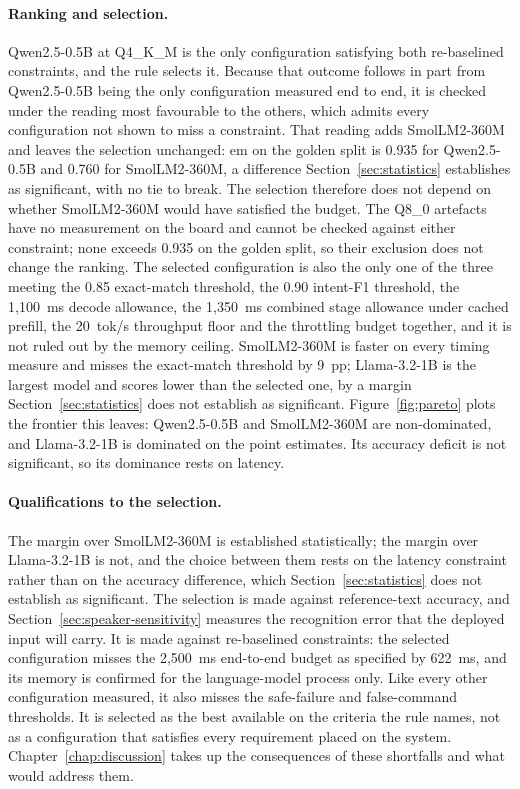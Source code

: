 \paragraph{Ranking and selection.} Qwen2.5-0.5B at Q4\_K\_M is the only configuration satisfying
both re-baselined constraints, and the rule selects it. Because that outcome follows in part from
Qwen2.5-0.5B being the only configuration measured end to end, it is checked under the reading
most favourable to the others, which admits every configuration not shown to miss a constraint.
That reading adds SmolLM2-360M and leaves the selection unchanged: \gls{em} on the golden split
is 0.935 for Qwen2.5-0.5B and 0.760 for SmolLM2-360M, a difference Section~\ref{sec:statistics}
establishes as significant, with no tie to break. The selection therefore does not depend on
whether SmolLM2-360M would have satisfied the budget. The Q8\_0 artefacts have no
measurement on the board and cannot be checked against either constraint; none exceeds 0.935 on
the golden split, so their exclusion does not change the ranking. The selected configuration is
also the only one of the three meeting the 0.85 exact-match threshold, the 0.90 intent-F1
threshold, the 1{,}100~ms decode allowance, the 1{,}350~ms combined stage allowance under cached
prefill, the 20~tok/s throughput floor and the throttling budget together, and it is not ruled out by the memory ceiling.
SmolLM2-360M is faster on every timing measure and misses the exact-match threshold by 9~pp;
Llama-3.2-1B is the largest model and scores lower than the selected one, by a margin
Section~\ref{sec:statistics} does not establish as significant. Figure~\ref{fig:pareto} plots the
frontier this leaves: Qwen2.5-0.5B and SmolLM2-360M are non-dominated, and Llama-3.2-1B is dominated
on the point estimates. Its accuracy deficit is not significant, so its dominance rests on latency.

\paragraph{Qualifications to the selection.} The margin over SmolLM2-360M is established
statistically; the margin over Llama-3.2-1B is not, and the choice between them rests on the
latency constraint rather than on the accuracy difference, which Section~\ref{sec:statistics} does
not establish as significant. The selection is made against reference-text accuracy, and
Section~\ref{sec:speaker-sensitivity} measures the recognition error that the deployed input will
carry. It is made against re-baselined constraints: the selected configuration misses the
2{,}500~ms end-to-end budget as specified by 622~ms, and its memory is confirmed for the
language-model process only. Like every other configuration measured, it also misses the
safe-failure and false-command thresholds. It is selected as the best available on the criteria
the rule names, not as a configuration that satisfies every requirement placed on the system.
Chapter~\ref{chap:discussion} takes up the consequences of these shortfalls and what would address
them.
